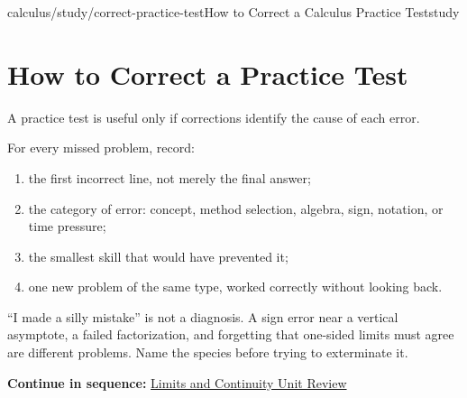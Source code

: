 \documentclass[11pt,openany]{book}
\theoremstyle{bgplain}
\newcommand{\webnext}[2]{%
  \par\addvspace{1.2em}\noindent{\color{BGLine}\rule{\textwidth}{0.35pt}}\par\smallskip
  {\small\color{BGGray}\textbf{Continue in sequence:} \hyperlink{web:#1}{#2}}\par
}
\begin{document}
\begin{webpage}{calculus/study/correct-practice-test}{How to Correct a Calculus Practice Test}{study}
\section{How to Correct a Practice Test}

A practice test is useful only if corrections identify the cause of each error.

For every missed problem, record:

\begin{enumerate}
  \item the first incorrect line, not merely the final answer;
  \item the category of error: concept, method selection, algebra, sign, notation, or time pressure;
  \item the smallest skill that would have prevented it;
  \item one new problem of the same type, worked correctly without looking back.
\end{enumerate}

\begin{bgconcept}
``I made a silly mistake'' is not a diagnosis. A sign error near a vertical asymptote, a failed factorization, and forgetting that one-sided limits must agree are different problems. Name the species before trying to exterminate it.
\end{bgconcept}
\webnext{calculus/limits/unit-review}{Limits and Continuity Unit Review}
\end{webpage}
\end{document}
